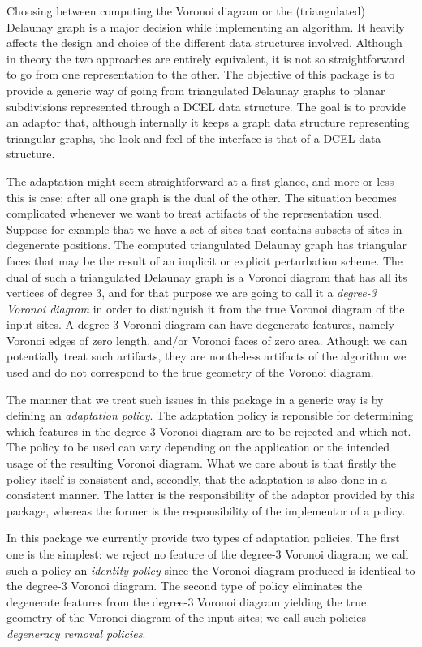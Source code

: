 Choosing between computing the Voronoi diagram or the (triangulated)
Delaunay graph is a major decision while implementing an algorithm. It
heavily affects the design and choice of the different data structures
involved. Although in theory the two approaches are entirely
equivalent, it is not so straightforward to go from one representation
to the other. The objective of this package is to provide a generic
way of going from triangulated Delaunay graphs to planar
subdivisions represented through a DCEL data structure. The goal is to
provide an adaptor that, although internally it keeps a graph data
structure representing triangular graphs, the look and feel of the
interface is that of a DCEL data structure.

The adaptation might seem straightforward at a first glance, and more
or less this is case; after all one graph is the dual of the
other. The situation becomes complicated whenever we want to treat
artifacts of the representation used. Suppose for example that we have
a set of sites that contains subsets of sites in degenerate
positions. The computed triangulated Delaunay graph has triangular
faces that may be the result of an implicit or explicit perturbation
scheme. The dual of such a triangulated Delaunay graph is a Voronoi
diagram that has all its vertices of degree 3, and for that purpose we
are going to call it a \emph{degree-3 Voronoi diagram} in order to
distinguish it from the true Voronoi diagram of the input sites. A
degree-3 Voronoi diagram can have degenerate features, namely Voronoi
edges of zero length, and/or Voronoi faces of zero area. Athough we
can potentially treat such artifacts, they are nontheless artifacts of
the algorithm we used and do not correspond to the true geometry of
the Voronoi diagram.

The manner that we treat such issues in this package in a generic way
is by defining an \emph{adaptation policy}. The adaptation policy is
reponsible for determining which features in the degree-3 Voronoi
diagram are to be rejected and which not. The policy to be used can
vary depending on the application or the intended usage of the
resulting Voronoi diagram. What we care about is that firstly the
policy itself is consistent and, secondly, that the adaptation is also
done in a consistent manner. The latter is the responsibility of the
adaptor provided by this package, whereas the former is the
responsibility of the implementor of a policy.

In this package we currently provide two types of adaptation
policies. The first one is the simplest: we reject no feature of the
degree-3 Voronoi diagram; we call such a policy an
\emph{identity policy} since the Voronoi diagram produced is identical
to the degree-3 Voronoi diagram. The second type of policy eliminates
the degenerate features from the degree-3 Voronoi diagram yielding
the true geometry of the Voronoi diagram of the input sites; we call
such policies \emph{degeneracy removal policies}.

